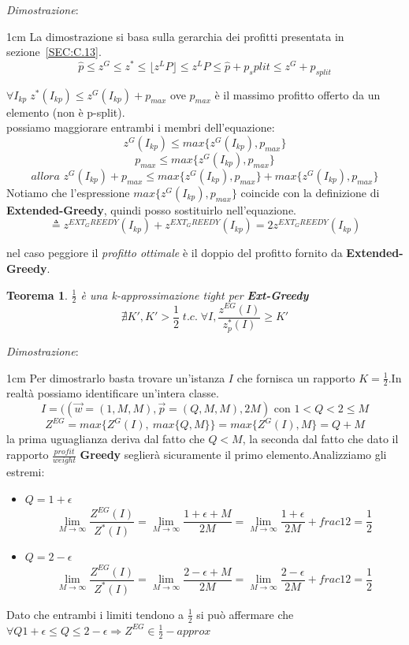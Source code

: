 \documentclass[a4paper]{article}
\newtheorem*{theorem}{Teorema}
\newenvironment{dimostrazione}{\textit{Dimostrazione}:\begin{adjustwidth}{1cm}{}}{\end{adjustwidth}}
\begin{document}
\begin{dimostrazione}
	La dimostrazione si basa sulla gerarchia dei profitti presentata in sezione~\ref{SEC:C.13}.\\
$$\hat p \leq z^G \leq z^* \leq \lfloor z^LP \rfloor  \leq z^LP \leq \hat p + p_split \leq z^G + p_{split}$$


$\forall I_{kp} \; z^*(I_{kp}) \leq z^G(I_{kp}) + p_{max}$ ove $p_{max}$ è il massimo profitto offerto da un elemento (non è p-split).\\
possiamo maggiorare entrambi i membri dell'equazione:
$$z^G(I_{kp}) \leq max\{z^G(I_{kp}), p_{max}\}$$
$$p_{max} \leq max\{z^G(I_{kp}), p_{max}\}$$
$$ \textit{allora } z^G(I_{kp}) + p_{max} \leq max\{z^G(I_{kp}), p_{max}\} + max\{z^G(I_{kp}), p_{max}\}$$
Notiamo che l'espressione $max\{z^G(I_{kp}), p_{max}\}$ coincide con la definizione di \textbf{Extended-Greedy}, quindi posso sostituirlo nell'equazione.
$$\triangleq z^{EXT_GREEDY}(I_{kp}) + z^{EXT_GREEDY}(I_{kp}) = 2z^{EXT_GREEDY}(I_{kp}) $$

nel caso peggiore il \textit{profitto ottimale} è il doppio del profitto fornito da \textbf{Extended-Greedy}.
\end{dimostrazione}
\begin{theorem} $\frac{1}{2}$ è una k-approssimazione tight per \textbf{Ext-Greedy}
	$$\nexists K', K' > \frac{1}{2} \; t.c. \; \forall I, \frac{z^{EG}(I)}{z^*_p(I)} \geq K'$$
\end{theorem}
\begin{dimostrazione}
	Per dimostrarlo basta trovare un'istanza $I$ che fornisca un rapporto $K=\frac{1}{2}$.In realtà possiamo identificare un'intera classe.
	$$I= ((\vec w = (1,M,M), \vec p = (Q,M,M),2M) \text{ con } 1<Q<2 \leq M$$
	$$ Z^{EG}= max\{Z^G(I),\: max\{Q,M\}\} = max\{Z^G(I),M\} = Q+M$$
	la prima uguaglianza deriva dal fatto che $Q < M$, la seconda dal fatto che dato il rapporto $\frac{profit}{weight}$ \textbf{Greedy} seglierà sicuramente il primo elemento.Analizziamo gli estremi:
	\begin{itemize}
		\item $Q= 1 + \epsilon$
			$$\lim_{M \to \infty} \frac{Z^{EG}(I)}{Z^*(I)} =  \lim_{M \to \infty}\frac{1+\epsilon + M}{2M} =\lim_{M \to \infty}\frac{1+\epsilon}{2M} + frac{1}{2} = \frac{1}{2}$$
		\item $Q= 2 - \epsilon$
			$$\lim_{M \to \infty} \frac{Z^{EG}(I)}{Z^*(I)} =  \lim_{M \to \infty}\frac{2-\epsilon + M}{2M} =\lim_{M \to \infty}\frac{2-\epsilon}{2M} + frac{1}{2} = \frac{1}{2}$$
	\end{itemize}
	Dato che entrambi i limiti tendono a $\frac{1}{2}$ si può affermare che $ \forall Q 1+\epsilon \leq Q \leq 2- \epsilon \Rightarrow Z^{EG} \in \frac{1}{2}-approx$
\end{dimostrazione}
\end{document}

